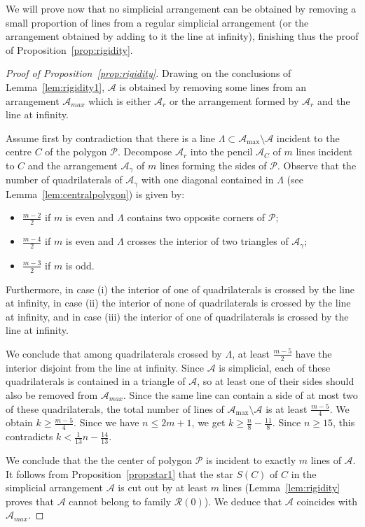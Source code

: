 \documentclass[a4paper,11pt,reqno]{amsart}
\theoremstyle{definition}
\theoremstyle{remark}
\theoremstyle{definition}
\theoremstyle{definition}
\theoremstyle{definition}
\numberwithin{equation}{section}
\begin{document}
We will prove now that no simplicial arrangement can be obtained by removing a small proportion of lines from a regular simplicial arrangement (or the arrangement obtained by adding to it the line at infinity), finishing thus the proof of Proposition~\ref{prop:rigidity}.

\begin{proof}[Proof of Proposition~\ref{prop:rigidity}]
Drawing on the conclusions of Lemma~\ref{lem:rigidity1}, $\mathcal{A}$ is obtained by removing some lines from an arrangement $\mathcal{A}_{max}$ which is either $\mathcal{A}_{r}$ or the arrangement formed by $\mathcal{A}_{r}$ and the line at infinity.
\par
Assume first by contradiction that there is a line $\Lambda\subset \mathcal{A}_{\max} \setminus \mathcal{A}$  incident to the centre $C$ of the polygon $\mathcal{P}$. 
Decompose $\mathcal{A}_{r}$ into the pencil $\mathcal{A}_{C}$ of $m$ lines incident to $C$ and the arrangement $\mathcal{A}_{\gamma}$ of $m$ lines forming the sides of $\mathcal{P}$. Observe that the number of quadrilaterals of $\mathcal{A}_{\gamma}$ with one diagonal  contained in $\Lambda$ (see Lemma~\ref{lem:centralpolygon}) is given by:
\begin{itemize}
    \item[(i)] $\frac{m-2}{2}$ if $m$ is even and $\Lambda$ contains two opposite corners of $\mathcal{P}$;
    \item[(ii)] $\frac{m-4}{2}$ if $m$ is even and $\Lambda$ crosses the interior of two triangles of $\mathcal{A}_{\gamma}$;
    \item[(iii)] $\frac{m-3}{2}$ if $m$ is odd.
\end{itemize}
Furthermore, in case (i) the interior of one of quadrilaterals is crossed by the line at infinity, in case (ii) the interior of none of quadrilaterals is crossed by the line at infinity, and in case (iii) the interior of one of quadrilaterals is crossed by the line at infinity.

We conclude that among  quadrilaterals crossed by $\Lambda$, at least $\frac{m-5}{2}$  have the interior disjoint from the line at infinity. Since $\mathcal{A}$ is simplicial, each of these quadrilaterals is contained in a triangle of $\mathcal{A}$, so at least one of their sides should also be removed from $\mathcal{A}_{max}$. Since the same line can contain a side of at most two of these quadrilaterals, the total number of lines of $\mathcal{A}_{\max} \setminus \mathcal{A}$ is at least $\frac{m-5}{4}$. We obtain $k \geq \frac{m-5}{4}$. Since we have $n \leq 2m+1$, we get $k \geq \frac{n}{8}-\frac{11}{8}$. Since $n \geq 15$, this contradicts $k < \frac{1}{13}n - \frac{14}{13}$.
\par
We conclude that the the center of polygon $\mathcal{P}$ is incident to exactly $m$ lines of $\mathcal{A}$. It follows from Proposition~\ref{prop:star1} that the star $S(C)$ of $C$ in the simplicial arrangement $\mathcal{A}$ is cut out by at least $m$ lines (Lemma~\ref{lem:rigidity} proves that $\mathcal{A}$ cannot belong to family $\mathcal{R}(0)$). We deduce that $\mathcal{A}$ coincides with $\mathcal{A}_{max}$.
\end{proof}
\end{document}
